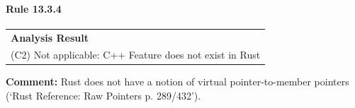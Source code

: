 \paragraph{Rule 13.3.4}
\begin{longtable}{p{13cm}}
\textbf{Analysis Result} \\
(C2) Not applicable: C++ Feature does not exist in Rust \\
\end{longtable}
\textbf{Comment:}  Rust does not have a notion of virtual pointer-to-member pointers (`Rust Reference: Raw Pointers p. 289/432'). \\
